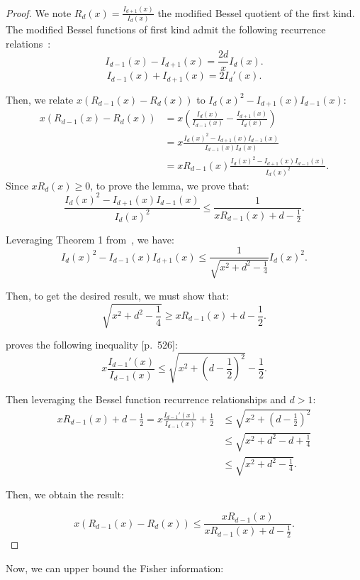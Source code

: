 \documentclass{article}
\theoremstyle{plain}
\theoremstyle{definition}
\theoremstyle{remark}
\begin{document}
\begin{proof}
We note $R_d(x) = \frac{I_{d+1}(x)}{I_{d}(x)}$ the modified Bessel quotient of the first kind.
The modified Bessel functions of first kind admit the following recurrence relations~\citep[11.115~and~11.116]{Arfken2011}:
    \[I_{d-1}(x) - I_{d+1}(x) = \frac{2d}{x}I_d(x).\]
    \[I_{d-1}(x) + I_{d+1}(x) = 2 I_d'(x).\]

    Then, we relate $x (R_{d-1}(x) - R_{d}(x))$ to $I_{d}(x)^2-I_{d+1}(x)I_{d-1}(x)$: \begin{align*}
        x (R_{d-1}(x) - R_{d}(x)) &= x \left( \frac{I_{d}(x)}{I_{d-1}(x)} - \frac{I_{d+1}(x)}{I_{d}(x)} \right)\\
        &=x  \frac{I_{d}(x)^2-I_{d+1}(x)I_{d-1}(x)}{I_{d-1}(x)I_d(x)} \\
        &= x R_{d-1}(x) \frac{I_{d}(x)^2-I_{d+1}(x)I_{d-1}(x)}{I_d(x)^2}.
    \end{align*}
    Since $x R_d(x) \geq 0$, to prove the lemma, we prove that:
    \[\frac{I_{d}(x)^2-I_{d+1}(x)I_{d-1}(x)}{I_d(x)^2} \leq \frac{1}{x R_{d-1}(x) +d-\frac{1}{2}}.\]

    Leveraging Theorem 1 from~\citet{Baricz2015}, we have:
    \[I_d(x)^2 - I_{d-1}(x)I_{d+1}(x) \leq \frac{1}{\sqrt{x^2 + d^2 - \frac{1}{4}}}I_d(x)^2.\]

    Then, to get the desired result, we must show that:
    \[\sqrt{x^2 + d^2 - \frac{1}{4}} \geq x R_{d-1}(x) +d -\frac{1}{2}.\]

    \citet{Segura2011} proves the following inequality [p.~526]:
    \[x\frac{I_{d-1}'(x)}{I_{d-1}(x)} \leq \sqrt{x^2 + \left(d - \frac{1}{2}\right)^2}-\frac{1}{2}.\]

    Then leveraging the Bessel function recurrence relationships and $d > 1$: \begin{align*}
        xR_{d-1}(x) + d - \frac{1}{2} = x \frac{I_{d-1}'(x)}{I_{d-1}(x)} + \frac{1}{2} &\leq  \sqrt{x^2 + \left(d - \frac{1}{2}\right)^2}\\
        &\leq \sqrt{x^2 + d^2 - d + \frac{1}{4}}\\
        &\leq \sqrt{x^2 + d^2 - \frac{1}{4}}.
    \end{align*}

    Then, we obtain the result:

    \[x(R_{d-1}(x) - R_{d}(x)) \leq \frac{x R_{d-1}(x)}{x R_{d-1}(x) + d -\frac{1}{2}}.\]
\end{proof}


Now, we can upper bound the Fisher information:
\end{document}
